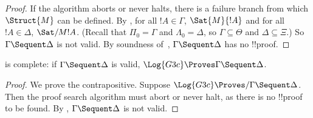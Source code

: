 \documentclass[../../../include/open-logic-section]{subfiles}
\begin{document}
\begin{proof}
  If the algorithm aborts or never halts, there is a failure branch
  from which $\Struct{M}$ can be defined. By , for
  all $!A \in \Gamma$, $\Sat{M}{!A}$ and for all $!A \in \Delta$,
  $\Sat/{M}{!A}$. (Recall that $\Pi_0 = \Gamma$ and $\Lambda_0 =
  \Delta$, so $\Gamma \subseteq \Theta$ and $\Delta \subseteq \Xi$.)
  So $\Gamma \Sequent \Delta$ is not valid. By soundness of~,
  $\Gamma \Sequent \Delta$ has no !!{proof}.
\end{proof}

\begin{cor}
 is complete: if $\Gamma \Sequent \Delta$ is valid,
$\Log{G3c} \Proves \Gamma \Sequent \Delta$.
\end{cor}

\begin{proof}
  We prove the contrapositive. Suppose $\Log{G3c} \Proves/ \Gamma
  \Sequent \Delta$. Then the proof search algorithm must abort or
  never halt, as there is no !!{proof} to be found. By , $\Gamma \Sequent \Delta$ is not
  valid.
\end{proof}
\end{document}
